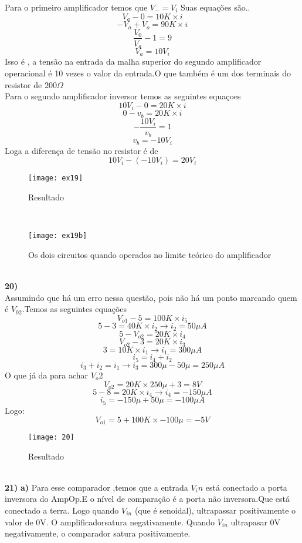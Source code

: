 \documentclass[11pt,a4paper]{article}
\begin{document}
Para o primeiro amplificador temos que $V_-=V_i$
Suas equações são..
$$V_a-0=10K\times i$$
$$-V_a+V_o=90K \times i$$
$$\frac{V_0}{V_a}-1=9$$
$$V_a=10V_i$$
Isso é , a tensão na entrada da malha superior do segundo amplificador operacional é 10 vezes o valor da entrada.O que também é um dos terminais do resistor de $200 \Omega$\\
Para o segundo amplificador inversor temos as seguintes equaçoes\\
$$10V_i-0=20K\times i$$
$$0-v_b=20K \times i$$
$$-\frac{10V_i}{v_b}=1$$
$$v_b=-10V_i$$
Loga a diferença de tensão no resistor é de 
$$10V_i-(-10V_i)=20V_i$$
\begin{figure}[!h]
\begin{center}
\texttt{[image: ex19]}
\caption{Resultado}
\end{center}
\end{figure}
\\
\begin{figure}[!h]
\begin{center}
\texttt{[image: ex19b]}
\caption{Os dois circuitos quando operados no limite teórico do amplificador}
\end{center}
\end{figure}
\\
\textbf{20) }
\\
Assumindo que há um erro nessa questão, pois não há um ponto marcando quem é $V_{02}$.Temos as seguintes equações\\
$$V_{o1}-5=100K\times i_5$$
$$5-3=40K\times i_2 \rightarrow i_2=50\mu A$$
$$5-V_{o2}=20K\times i_4$$
$$V_{o2}-3=20K\times i_3$$
$$3=10K\times i_1\rightarrow i_1=300\mu A$$
$$i_5=i_4+i_2$$
$$i_3+i_2=i_1 \rightarrow i_3=300\mu -50\mu =250\mu A$$
O que já da para achar $V_o2$
$$V_{o2}=20K\times 250\mu +3=8 V$$
$$5-8=20K\times i_4 \rightarrow i_4=-150\mu A$$
$$i_5=-150\mu + 50\mu=-100 \mu A$$
Logo:
$$V_{o1}=5+100K\times -100\mu=-5V$$
\begin{figure}[!h]
\begin{center}
\texttt{[image: 20]}
\caption{Resultado}
\end{center}
\end{figure}
\\
\newpage
\textbf{21) }
\textbf{a) }
Para esse comparador ,temos que a entrada $V_in$ está conectado a porta inversora do AmpOp.E o nível de comparação é a porta não inversora.Que está conectado a terra. Logo quando $V_{in}$ (que é senoidal), ultrapassar positivamente o valor de 0V. O amplificadorsatura negativamente. Quando $V_{in}$ ultrapasar 0V negativamente, o comparador satura positivamente.
\end{document}
